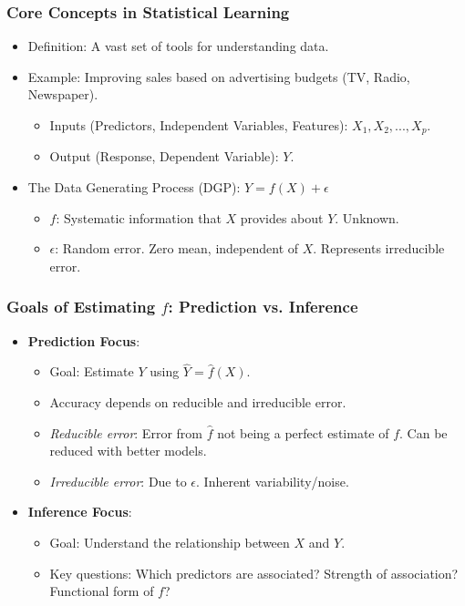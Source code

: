 \documentclass[12pt,a4paper]{article}
\begin{document}
    \subsubsection{Core Concepts in Statistical Learning }
        \begin{itemize}
            \item Definition: A vast set of tools for understanding data.
            \item Example: Improving sales based on advertising budgets (TV, Radio, Newspaper).
                \begin{itemize}
                    \item Inputs (Predictors, Independent Variables, Features): $X_1, X_2, ..., X_p$.
                    \item Output (Response, Dependent Variable): $Y$.
                \end{itemize}
            \item The Data Generating Process (DGP): $Y = f(X) + \epsilon$
                \begin{itemize}
                    \item $f$: Systematic information that $X$ provides about $Y$. Unknown.
                    \item $\epsilon$: Random error. Zero mean, independent of $X$. Represents irreducible error.
                \end{itemize}
        \end{itemize}

    \subsubsection{Goals of Estimating $f$: Prediction vs. Inference }
        \begin{itemize}
            \item \textbf{Prediction Focus}:
                \begin{itemize}
                    \item Goal: Estimate $Y$ using $\hat{Y} = \hat{f}(X)$.
                    \item Accuracy depends on reducible and irreducible error.
                    \item \textit{Reducible error}: Error from $\hat{f}$ not being a perfect estimate of $f$. Can be reduced with better models.
                    \item \textit{Irreducible error}: Due to $\epsilon$. Inherent variability/noise.
                \end{itemize}
            \item \textbf{Inference Focus}:
                \begin{itemize}
                    \item Goal: Understand the relationship between $X$ and $Y$.
                    \item Key questions: Which predictors are associated? Strength of association? Functional form of $f$?
                \end{itemize}
        \end{itemize}
\end{document}
